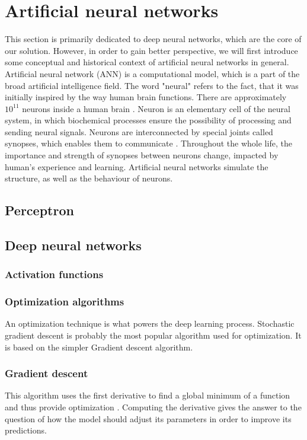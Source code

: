 \section{Artificial neural networks}
This section is primarily dedicated to deep neural networks, which are the core of our solution. However, in order to gain better perspective, we will first introduce some conceptual and historical context of artificial neural networks in general.
Artificial neural network (ANN) is a computational model, which is a part of the broad artificial intelligence field. The word "neural" refers to the fact, that it was initially inspired by the way human brain functions. There are approximately $10^{11}$ neurons inside a human brain \cite{navrat2007umela}. Neuron is an elementary cell of the neural system, in which biochemical processes ensure the possibility of processing and sending neural signals. Neurons are interconnected by special joints called synopses, which enables them to communicate \cite{navrat2007umela}. Throughout the whole life, the importance and strength of synopses between neurons change, impacted by human's experience and learning. Artificial neural networks simulate the structure, as well as the behaviour of neurons. 
\subsection*{Perceptron}
\subsection{Deep neural networks}


\subsubsection{Activation functions}
\subsubsection{Optimization algorithms}
An optimization technique is what powers the deep learning process. Stochastic gradient descent is probably the most popular algorithm used for optimization. It is based on the simpler Gradient descent algorithm.

\subsubsection*{Gradient descent}
This algorithm uses the first derivative to find a global minimum of a function and thus provide optimization \cite{deeplearningbook}. Computing the derivative gives the answer to the question of how the model should adjust its parameters in order to improve its predictions.
